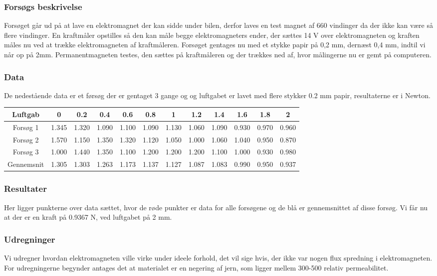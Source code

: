 \subsubsection*{Forsøgs beskrivelse}
Forsøget går ud på at lave en elektromagnet der kan sidde under bilen, derfor laves en test magnet af 660 vindinger da der ikke kan være så flere vindinger. En kraftmåler opstilles så den kan måle begge elektromagneters ender, der sættes 14 V over elektromagneten og kraften måles nu ved at trække elektromagneten af kraftmåleren. Forsøget gentages nu med et stykke papir på 0,2 mm, dernæst 0,4 mm, indtil vi når op på 2mm. Permanentmagneten testes, den sættes på kraftmåleren og der trækkes ned af, hvor målingerne nu er gemt på computeren.

\subsubsection*{Data}
De nedestående data er et førsøg der er gentaget 3 gange og og luftgabet er lavet med flere stykker 0.2 mm papir, resultaterne er i Newton. \\
\begin{tabular}{|c|c|c|c|c|c|c|c|c|c|c|c|}
\hline 
Luftgab & 0 & 0.2 & 0.4 & 0.6 & 0.8 & 1 & 1.2 & 1.4 & 1.6 & 1.8 & 2 \\ 
\hline 
Forsøg 1 & 1.345 & 1.320 & 1.090 & 1.100 & 1.090 & 1.130 & 1.060 & 1.090 & 0.930 & 0.970 & 0.960 \\ 
\hline 
Forsøg 2 & 1.570 & 1.150 & 1.350 & 1.320 & 1.120 & 1.050 & 1.000 & 1.060 & 1.040 & 0.950 & 0.870 \\ 
\hline 
Forsøg 3 & 1.000 & 1.440 & 1.350 & 1.100 & 1.200 & 1.200 & 1.200 & 1.100 & 1.000 & 0.930 & 0.980 \\ 
\hline 
Gennemsnit & 1.305 & 1.303 & 1.263 & 1.173 & 1.137 & 1.127 & 1.087 & 1.083 & 0.990 & 0.950 & 0.937 \\ 
\hline 
\end{tabular} 

\subsubsection*{Resultater}
Her ligger punkterne over data sættet, hvor de røde punkter er data for alle forsøgene og de blå er gennemsnittet af disse forsøg. Vi får nu at der er en kraft på 0.9367 N, ved luftgabet på 2 mm.

\subsubsection*{Udregninger}
Vi udregner hvordan elektromagneten ville virke under ideele forhold, det vil sige hvis, der ikke var nogen flux spredning i elektromagneten. For udregningerne begynder antages det at materialet er en negering af jern, som ligger mellem 300-500 relativ permeabilitet.\\

